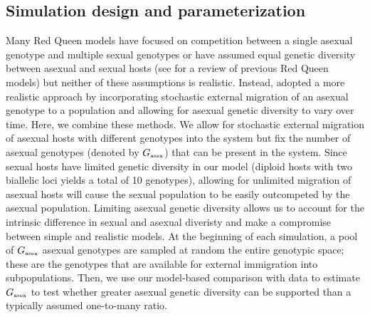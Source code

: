 \documentclass{article}\usepackage[]{graphicx}\usepackage[]{color}
\begin{document}
\subsection{Simulation design and parameterization}

Many Red Queen models have focused on competition between a single asexual genotype and multiple sexual genotypes or have assumed equal genetic diversity between asexual and sexual hosts (see \citep{ashby2015diversity} for a review of previous Red Queen models) but neither of these assumptions is realistic.
Instead, \cite{ashby2015diversity} adopted a more realistic approach by incorporating stochastic external migration of an asexual genotype to a population and allowing for asexual genetic diversity to vary over time.
Here, we combine these methods.
We allow for stochastic external migration of asexual hosts with different genotypes into the system but fix the number of asexual genotypes (denoted by $G_{\textrm{\tiny asex}}$) that can be present in the system. 
Since sexual hosts have limited genetic diversity in our model (diploid hosts with two biallelic loci yields a total of 10 genotypes), allowing for unlimited migration of asexual hosts will cause the sexual population to be easily outcompeted by the asexual population.
Limiting asexual genetic diversity allows us to account for the intrinsic difference in sexual and asexual diveristy and make a compromise between simple and realistic models.
At the beginning of each simulation, a pool of $G_{\textrm{\tiny asex}}$ asexual genotypes are sampled at random the entire genotypic space; these are the genotypes that are available for external immigration into subpopulations.
Then, we use our model-based comparison with data to estimate $G_{\textrm{\tiny asex}}$ to test whether greater asexual genetic diversity can be supported than a typically assumed one-to-many ratio.
\end{document}
